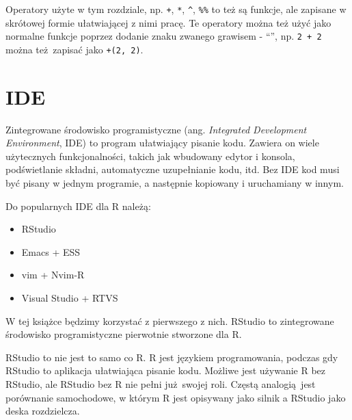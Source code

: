 \documentclass[paper=6in:9in,pagesize=pdftex,headinclude=on,footinclude=on,10pt]{scrbook}
\makeatletter
\providecommand{\tightlist}{%
  \setlength{\itemsep}{0pt}\setlength{\parskip}{0pt}}
\newenvironment{kframe}{%
\medskip{}
\setlength{\fboxsep}{.8em}
 \def\at@end@of@kframe{}%
 \ifinner\ifhmode%
  \def\at@end@of@kframe{\end{minipage}}%
  \begin{minipage}{\columnwidth}%
 \fi\fi%
 \def\FrameCommand##1{\hskip\@totalleftmargin \hskip-\fboxsep
 \colorbox{shadecolor}{##1}\hskip-\fboxsep
     \hskip-\linewidth \hskip-\@totalleftmargin \hskip\columnwidth}%
 \MakeFramed {\advance\hsize-\width
   \@totalleftmargin\z@ \linewidth\hsize
   \@setminipage}}%
 {\par\unskip\endMakeFramed%
 \at@end@of@kframe}
\newenvironment{rmdblock}[1]
  {
  \begin{itemize}
  \renewcommand{\labelitemi}{
    \raisebox{-.7\height}[0pt][0pt]{
      {\setkeys{Gin}{width=3em,keepaspectratio}\texttt{[image: images/\#1]}}
    }
  }
  \setlength{\fboxsep}{1em}
  \begin{kframe}
  \item
  }
  {
  \end{kframe}
  \end{itemize}
  }
\newenvironment{rmdinfo}
  {\begin{rmdblock}{compass}}
  {\end{rmdblock}}
\makeatother
\begin{document}
\begin{rmdinfo}
\begin{rmdinfo}

Operatory użyte w tym rozdziale, np. \texttt{+}, \texttt{*}, \texttt{\^{}}, \texttt{\%\%} to też są funkcje, ale zapisane w skrótowej formie ułatwiającej z nimi pracę.
Te operatory można też użyć jako normalne funkcje poprzez dodanie znaku zwanego grawisem - ``\texttt{\textasciigrave{}}'', np. \texttt{2\ +\ 2} można też~zapisać jako \texttt{\textasciigrave{}+\textasciigrave{}(2,\ 2)}.

\end{rmdinfo}
\end{rmdinfo}

\hypertarget{ide}{%
\section{IDE}\label{ide}}

Zintegrowane środowisko programistyczne (ang. \emph{Integrated Development Environment}, IDE) to program ułatwiający pisanie kodu.
Zawiera on wiele użytecznych funkcjonalności, takich jak wbudowany edytor i konsola, podświetlanie składni, automatyczne uzupełnianie kodu, itd.
Bez IDE kod musi być pisany w jednym programie, a następnie kopiowany i uruchamiany w innym.

Do popularnych IDE dla R należą:

\begin{itemize}
\tightlist
\item
  RStudio
\item
  Emacs + ESS
\item
  vim + Nvim-R
\item
  Visual Studio + RTVS
\end{itemize}

W tej książce będzimy korzystać z pierwszego z nich.
RStudio to zintegrowane środowisko programistyczne pierwotnie stworzone dla R.

\begin{rmdinfo}
\begin{rmdinfo}

RStudio to nie jest to samo co R.
R jest językiem programowania, podczas gdy RStudio to aplikacja ułatwiająca pisanie kodu.
Możliwe jest używanie R bez RStudio, ale RStudio bez R nie pełni już~swojej roli.
Częstą analogią~jest porównanie samochodowe, w którym R jest opisywany jako silnik a RStudio jako deska rozdzielcza.

\end{rmdinfo}
\end{rmdinfo}
\end{document}
